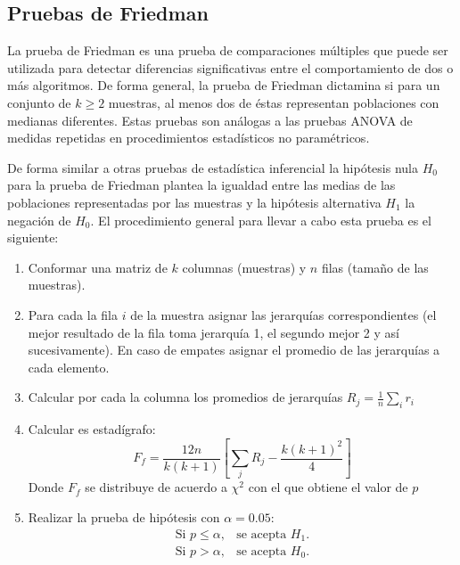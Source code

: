\subsection{Pruebas de Friedman}
La prueba de Friedman es una prueba de comparaciones múltiples que puede ser utilizada para detectar diferencias significativas entre el comportamiento de dos o más algoritmos. De forma general, la prueba de Friedman dictamina si para un conjunto de $k \geq 2$ muestras, al menos dos de éstas representan poblaciones con medianas diferentes. Estas pruebas son análogas a las pruebas ANOVA de medidas repetidas en procedimientos estadísticos no paramétricos. 

De forma similar a otras pruebas de estadística inferencial la hipótesis nula $H_0$ para la prueba de Friedman plantea la igualdad entre las medias de las poblaciones representadas por las muestras y la hipótesis alternativa $H_1$ la negación de $H_0$. El procedimiento general para llevar a cabo esta prueba es el siguiente:
\begin{enumerate}
	\item Conformar una matriz de $k$ columnas (muestras) y $n$ filas (tamaño de las muestras).
	\item Para cada la fila $i$ de la muestra asignar las jerarquías correspondientes (el mejor resultado de la fila toma jerarquía 1, el segundo mejor 2 y así sucesivamente). En caso de empates asignar el promedio de las jerarquías a cada elemento.
	\item Calcular por cada la columna los promedios de jerarquías  $R_j=\frac{1}{n}\sum_i{r_i}$ 
	\item Calcular es estadígrafo:
	\begin{equation}
	F_f=\frac{12n}{k(k+1)}\left [  \sum_j{R_j}-\frac{k(k+1)^2}{4}\right]
	\end{equation}
	Donde $F_f$ se distribuye de acuerdo a $\chi^2$ con el que obtiene el valor de $p$
	\item Realizar la prueba de hipótesis con $\alpha=0.05$:
	\begin{eqnarray}
	\text{Si } p \leq \alpha,& \text{se acepta } H_1.\\
	\text{Si } p> \alpha,& \text{se acepta } H_0.
	\end{eqnarray}
	
\end{enumerate}

